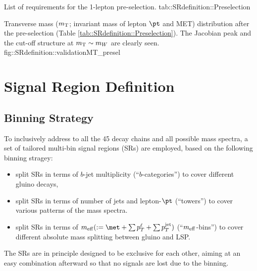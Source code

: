 {List of requirements for the 1-lepton pre-selection.}
{tab::SRdefinition::Preselection}


{Transverse mass ($m_{\mathrm{T}}$; invariant mass of lepton $\pt$ and MET) distribution after the pre-selection (Table \ref{tab::SRdefinition::Preselection}). The Jacobian peak and the cut-off structure at $m_{\mathrm{T}}\sim m_W$ are clearly seen.}
{fig::SRdefinition::validationMT_presel}



\section{Signal Region Definition}
\subsection{Binning Strategy}
To inclusively address to all the 45 decay chains and all possible mass spectra, a set of tailored multi-bin signal regions (SRs) are employed, based on the following binning stragey:
\begin{itemize}
\item split SRs in terms of $b$-jet multiplicity (``$b$-categories'') to cover different gluino decays, 
\item split SRs in terms of number of jets and lepton-$\pt$ (``towers'') to cover various patterns of the mass spectra. 
\item split SRs in terms of $\meffInc (\meffDef)$ (``$m_{\mathrm{eff}}$-bins'') to cover different absolute mass splitting between gluino and LSP. 
\end{itemize}
The SRs are in principle designed to be exclusive for each other, aiming at an easy combination afterward so that no signals are lost due to the binning. 

